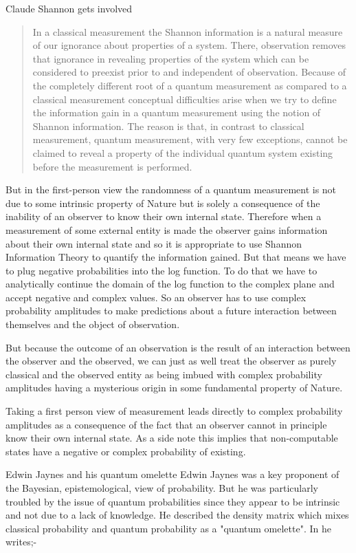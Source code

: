 \documentclass[final]{beamer}
\newlength{\colwidth}
\begin{document}
\begin{frame}[t]
\begin{columns}[t]
\begin{column}{\colwidth}
\begin{block}{Claude Shannon gets involved}
  \begin{quote}
  In a classical measurement the Shannon information is a natural measure of our ignorance about properties of a system. There, observation removes that ignorance in revealing properties of the system which can be considered to preexist prior to and independent of observation. Because of the completely different root of a quantum measurement as compared to a classical measurement conceptual difficulties arise when we try to define the information gain in a quantum measurement using the notion of Shannon information. The reason is that, in contrast to classical measurement, quantum measurement, with very few exceptions, cannot be claimed to reveal a property of the individual quantum system existing before the measurement is performed.
  \end{quote}
  But in the first-person view the randomness of a quantum measurement is not due to some intrinsic property of Nature but is solely a consequence of the inability of an observer to know their own internal state. Therefore when a measurement of some external entity is made the observer gains information about their own internal state and so it is appropriate to use Shannon Information Theory to quantify the information gained. But that means we have to plug negative probabilities into the log function. To do that we have to analytically continue the domain of the log function to the complex plane and accept negative and complex values. So an observer has to use complex probability amplitudes to make predictions about a future interaction between themselves and the object of observation.
  
  But because the outcome of an observation is the result of an interaction between the observer and the observed, we can just as well treat the observer as purely classical and the observed entity as being imbued with complex probability amplitudes having a mysterious origin in some fundamental property of Nature. 

  Taking a first person view of measurement leads directly to complex probability amplitudes as a consequence of the fact that an observer cannot in principle know their own internal state. As a side note this implies that non-computable states have a negative or complex probability of existing. 
  \end{block}

  \begin{block}{Edwin Jaynes and his quantum omelette}
  Edwin Jaynes was a key proponent of the Bayesian, epistemological, view of probability. But he was particularly troubled by the issue of quantum probabilities since they appear to be intrinsic and not due to a lack of knowledge. He described the density matrix which mixes classical probability and quantum probability as a "quantum omelette". In \autocite{Jaynes_89_a} he writes;-
  

\end{block}
\end{column}
\end{columns}
\end{frame}
\end{document}
